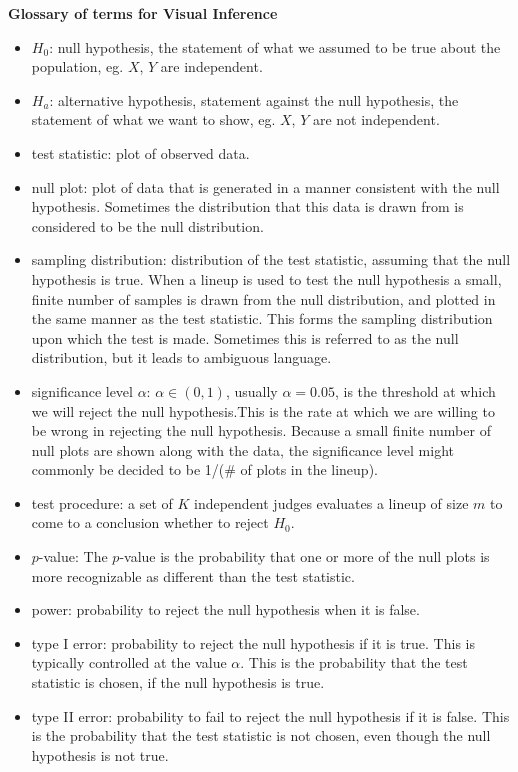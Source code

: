 \documentclass[12]{report}
\begin{document}
\centerline{\bf\large Glossary of terms for Visual Inference}

\begin{itemize}
\item $H_0$: null hypothesis, the statement of what we assumed to be true about the population, eg. $X$, $Y$ are independent. \\
\item $H_a$:  alternative hypothesis, statement against the null hypothesis, the statement of what we want to show, eg. $X$, $Y$ are not independent. \\
\item test statistic:  plot of observed data.  \\
\item null plot: plot of data that is generated in a manner consistent with the null hypothesis. Sometimes the distribution that this data is drawn from is considered to be the null distribution. \\
\item sampling distribution:  distribution of the test statistic, assuming that the null hypothesis is true. When a lineup is used to test the null hypothesis a small, finite number of samples is drawn from the null distribution, and plotted in the same manner as the test statistic. This forms the sampling distribution upon which the test is made. Sometimes this is referred to as the null distribution, but it leads to ambiguous language. \\
\item significance level $\alpha$:  $\alpha \in (0,1)$, usually $\alpha=0.05$, is the threshold at which we will reject the null hypothesis.This is the rate at which we are willing to be wrong in rejecting the null hypothesis. Because a small finite number of null plots are shown along with the data, the significance level might commonly be decided to be 1/(\# of plots in the lineup). \\
\item test procedure:  a set of $K$ independent judges evaluates a lineup of size $m$ to come to a conclusion whether to reject $H_0$.\\
\item $p$-value:  The $p$-value is the probability that one or more of the null plots is more recognizable as different than the test statistic. \\
\item power:  probability to reject the null hypothesis when it is false. \\
\item type I error:  probability to reject the null hypothesis if it is true. This is typically controlled at the value $\alpha$. This is the probability that the test statistic is chosen, if the null hypothesis is true.\\
\item type II error:  probability to fail to reject the null hypothesis if it is false. This is the probability that the test statistic is not chosen, even though the null hypothesis is not true.\\


\end{itemize}
\end{document}

